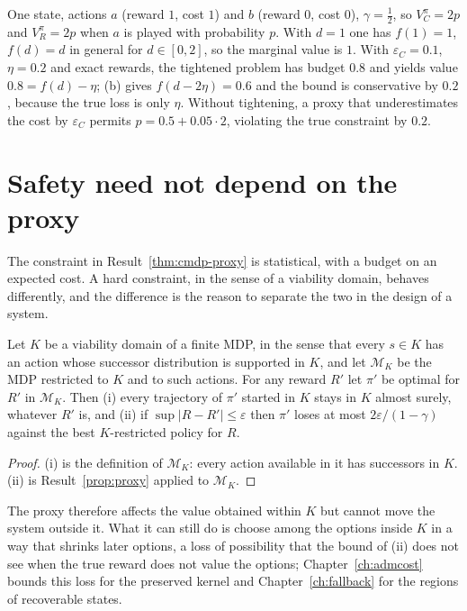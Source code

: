 \begin{example}\label{ex:steep}
One state, actions $a$ (reward $1$, cost $1$) and $b$ (reward $0$, cost $0$), $\gamma=\tfrac12$, so $V_C^\pi=2p$ and $V_R^\pi=2p$ when $a$ is played with probability $p$. With $d=1$ one has $f(1)=1$, $f(d)=d$ in general for $d\in[0,2]$, so the marginal value is $1$. With $\varepsilon_C=0.1$, $\eta=0.2$ and exact rewards, the tightened problem has budget $0.8$ and yields value $0.8=f(d)-\eta$; (b) gives $f(d-2\eta)=0.6$ and the bound is conservative by $0.2$, because the true loss is only $\eta$. Without tightening, a proxy that underestimates the cost by $\varepsilon_C$ permits $p=0.5+0.05\cdot2$, violating the true constraint by $0.2$.
\end{example}

\section{Safety need not depend on the proxy}

The constraint in Result~\ref{thm:cmdp-proxy} is statistical, with a budget on an expected cost. A hard constraint, in the sense of a viability domain, behaves differently, and the difference is the reason to separate the two in the design of a system.

\begin{newresult}\label{prop:safe-proxy}
Let $K$ be a viability domain of a finite MDP, in the sense that every $s\in K$ has an action whose successor distribution is supported in $K$, and let $\mathcal M_K$ be the MDP restricted to $K$ and to such actions. For any reward $R'$ let $\pi'$ be optimal for $R'$ in $\mathcal M_K$. Then (i) every trajectory of $\pi'$ started in $K$ stays in $K$ almost surely, whatever $R'$ is, and (ii) if $\sup|R-R'|\le\varepsilon$ then $\pi'$ loses at most $2\varepsilon/(1-\gamma)$ against the best $K$-restricted policy for $R$.
\end{newresult}
\begin{proof}
(i) is the definition of $\mathcal M_K$: every action available in it has successors in $K$. (ii) is Result~\ref{prop:proxy} applied to $\mathcal M_K$.
\end{proof}

The proxy therefore affects the value obtained within $K$ but cannot move the system outside it. What it can still do is choose among the options inside $K$ in a way that shrinks later options, a loss of possibility that the bound of (ii) does not see when the true reward does not value the options; Chapter~\ref{ch:admcost} bounds this loss for the preserved kernel and Chapter~\ref{ch:fallback} for the regions of recoverable states.


